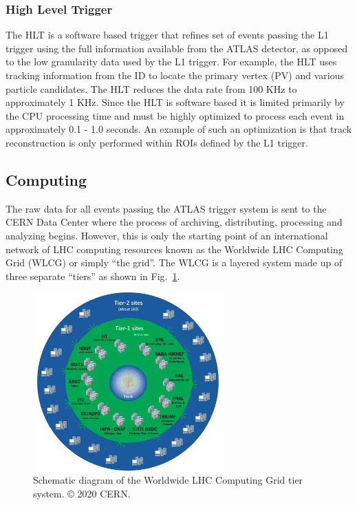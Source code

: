 \subsubsection{High Level Trigger}
The HLT is a software based trigger that refines set of events passing the L1 trigger using the full information available from the ATLAS detector, as opposed to the low granularity data used by the L1 trigger.
For example, the HLT uses tracking information from the ID to locate the primary vertex (PV)  and various particle candidates.
The HLT reduces the data rate from 100 KHz to approximately 1 KHz.
Since the HLT is software based it is limited primarily by the CPU processing time and must be highly optimized to process each event in approximately 0.1 - 1.0 seconds.
An example of such an optimization is that track reconstruction  is only performed within ROIs defined by the L1 trigger.

\subsection{Computing}
The raw data for all events passing the ATLAS trigger system is sent to the CERN Data Center where the process of archiving, distributing, processing and analyzing begins.
However, this is only the starting point of an international network of LHC computing resources \cite{Bird:1447125} known as the Worldwide LHC Computing Grid (WLCG) or simply ``the grid''.
The WLCG is a layered system made up of three separate ``tiers'' as shown in Fig.~\ref{fig:wlcg_tiers}.

\begin{figure}
	\centering
	\includegraphics[width=0.65\textwidth]{wlcg_tiers}
	\caption{Schematic diagram of the Worldwide LHC Computing Grid tier system. © 2020 CERN.}
	\label{fig:wlcg_tiers}
\end{figure}

